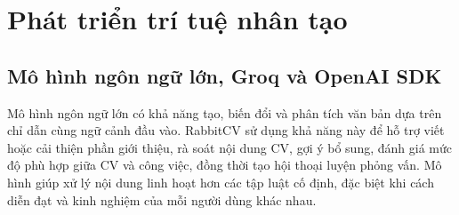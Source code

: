 




\section{Phát triển trí tuệ nhân tạo}

\subsection{Mô hình ngôn ngữ lớn, Groq và OpenAI SDK}

Mô hình ngôn ngữ lớn có khả năng tạo, biến đổi và phân tích văn bản dựa trên chỉ dẫn cùng ngữ cảnh đầu vào. RabbitCV sử dụng khả năng này để hỗ trợ viết hoặc cải thiện phần giới thiệu, rà soát nội dung CV, gợi ý bổ sung, đánh giá mức độ phù hợp giữa CV và công việc, đồng thời tạo hội thoại luyện phỏng vấn. Mô hình giúp xử lý nội dung linh hoạt hơn các tập luật cố định, đặc biệt khi cách diễn đạt và kinh nghiệm của mỗi người dùng khác nhau.

